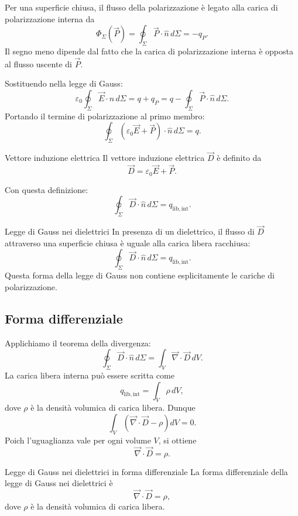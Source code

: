 \documentclass[a4paper]{article}
\begin{document}
Per una superficie chiusa, il flusso della polarizzazione è legato alla carica di polarizzazione interna da
\[
    \Phi_\Sigma(\vec{P})=\oint_\Sigma \vec{P}\cdot\hat{n}\,d\Sigma=-q_P.
\]
Il segno meno dipende dal fatto che la carica di polarizzazione interna è opposta al flusso uscente di \(\vec{P}\).

Sostituendo nella legge di Gauss:
\[
    \varepsilon_0\oint_\Sigma \vec{E}\cdot\hat{n}\,d\Sigma=q+q_P
    =q-\oint_\Sigma \vec{P}\cdot\hat{n}\,d\Sigma.
\]
Portando il termine di polarizzazione al primo membro:
\[
    \oint_\Sigma \left(\varepsilon_0\vec{E}+\vec{P}\right)\cdot\hat{n}\,d\Sigma=q.
\]

\begin{snippetdefinition}{Vettore induzione elettrica}
    Il vettore induzione elettrica \(\vec{D}\) è definito da
    \[
        \vec{D}=\varepsilon_0\vec{E}+\vec{P}.
    \]
\end{snippetdefinition}

Con questa definizione:
\[
    \oint_\Sigma \vec{D}\cdot\hat{n}\,d\Sigma=q_{\mathrm{lib,int}}.
\]

\begin{snippettheorem}{Legge di Gauss nei dielettrici}
    In presenza di un dielettrico, il flusso di \(\vec{D}\) attraverso una superficie chiusa è uguale alla carica libera racchiusa:
    \[
        \oint_\Sigma \vec{D}\cdot\hat{n}\,d\Sigma=q_{\mathrm{lib,int}}.
    \]
    Questa forma della legge di Gauss non contiene esplicitamente le cariche di polarizzazione.
\end{snippettheorem}

\subsection{Forma differenziale}

Applichiamo il teorema della divergenza:
\[
    \oint_\Sigma \vec{D}\cdot\hat{n}\,d\Sigma
    =\int_V \vec{\nabla}\cdot\vec{D}\,dV.
\]
La carica libera interna può essere scritta come
\[
    q_{\mathrm{lib,int}}=\int_V \rho\,dV,
\]
dove \(\rho\) è la densità volumica di carica libera. Dunque
\[
    \int_V \left(\vec{\nabla}\cdot\vec{D}-\rho\right)dV=0.
\]
Poich l'uguaglianza vale per ogni volume \(V\), si ottiene
\[
    \vec{\nabla}\cdot\vec{D}=\rho.
\]

\begin{snippettheorem}{Legge di Gauss nei dielettrici in forma differenziale}
    La forma differenziale della legge di Gauss nei dielettrici è
    \[
        \vec{\nabla}\cdot\vec{D}=\rho,
    \]
    dove \(\rho\) è la densità volumica di carica libera.
\end{snippettheorem}
\end{document}
